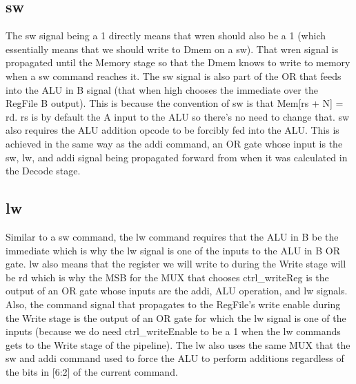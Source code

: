 \documentclass[letterpaper]{article} %
\begin{document}
    
    \subsection{sw}
        The sw signal being a 1 directly means that wren should also be a 1 (which essentially means that we should write to Dmem on a sw). That wren signal is propagated until the Memory stage so that the Dmem knows to write to memory when a sw command reaches it. The sw signal is also part of the OR that feeds into the ALU in B signal (that when high chooses the immediate over the RegFile B output). This is because the convention of sw is that Mem[rs + N] = rd. rs is by default the A input to the ALU so there's no need to change that. sw also requires the ALU addition opcode to be forcibly fed into the ALU. This is achieved in the same way as the addi command, an OR gate whose input is the sw, lw, and addi signal being propagated forward from when it was calculated in the Decode stage.
    
    \subsection{lw}
        Similar to a sw command, the lw command requires that the ALU in B be the immediate which is why the lw signal is one of the inputs to the ALU in B OR gate. lw also means that the register we will write to during the Write stage will be rd which is why the MSB for the MUX that chooses ctrl\_writeReg is the output of an OR gate whose inputs are the addi, ALU operation, and lw signals. Also, the command signal that propagates to the RegFile's write enable during the Write stage is the output of an OR gate for which the lw signal is one of the inputs (because we do need ctrl\_writeEnable to be a 1 when the lw commands gets to the Write stage of the pipeline). The lw also uses the same MUX that the sw and addi command used to force the ALU to perform additions regardless of the bits in [6:2] of the current command. 
        
        
\end{document}
